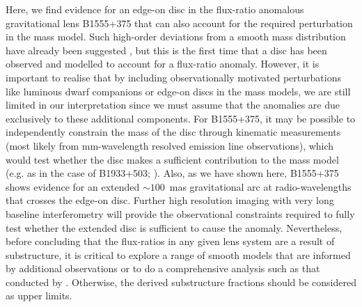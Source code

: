 \documentclass[a4paper,fleqn,usenatbib,useAMS]{mnras}
\begin{document}
Here, we find evidence for an edge-on disc in the flux-ratio anomalous gravitational lens B1555+375 that can also account for the required perturbation in the mass model. Such high-order deviations from a smooth mass distribution have already been suggested \citep{evans03,congdon05}, but this is the first time that a disc has been observed and modelled to account for a flux-ratio anomaly. However, it is important to realise that by including observationally motivated perturbations like luminous dwarf companions or edge-on discs in the mass models, we are still limited in our interpretation since we must assume that the anomalies are due exclusively to these additional components. For B1555+375, it may be possible to independently constrain the mass of the disc through kinematic measurements (most likely from mm-wavelength resolved emission line observations), which would test whether the disc makes a sufficient contribution to the mass model (e.g. as in the case of B1933+503; \citealt{suyu12}). Also, as we have shown here, B1555+375 shows evidence for an extended $\sim100$~mas gravitational arc at radio-wavelengths that crosses the edge-on disc. Further high resolution imaging with very long baseline interferometry will provide the observational constraints required to fully test whether the extended disc is sufficient to cause the anomaly. Nevertheless, before concluding that the flux-ratios in any given lens system are a result of substructure, it is critical to explore a range of smooth models that are informed by additional observations or to do a comprehensive analysis such as that conducted by \citet{Xu15}. Otherwise, the derived substructure fractions should be considered as upper limits.
\end{document}
